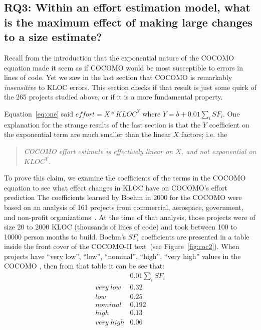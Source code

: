 \documentclass[final,twocolumn]{elsarticle}
\newcommand{\fig}[1]{Figure~\ref{fig:#1}}
\newcommand{\eq}[1]{Equation~\ref{eq:#1}}
\theoremstyle{break}
\begin{document}
\subsection{ RQ3:
  Within an effort estimation model,
  what is the maximum effect of making large changes to a size estimate?}

 Recall from the introduction that the exponential nature of the COCOMO equation
 made it seem as if COCOMO would be most susceptible to errors in lines of code.
 Yet we saw in the last section that COCOMO is remarkably {\em insensitive} to
 KLOC errors.  This section checks if that result is just some quirk of the 265
 projects studied above, or if it is a more fundamental property. 

 \eq{one} said  \mbox{$\mathit{effort} = \mathit{X*KLOC}^Y$}
 where \mbox{$Y={b + 0.01 \sum_i SF_i}$}.
 One explanation for the strange results of the last section is
 that the $Y$ coefficient on the exponential term are much smaller than the
 linear $X$ factors; i.e. the
 \begin{quote}
   {\em COCOMO effort estimate is
     effectively linear on $X$, and not exponential on $\mathit{KLOC^Y}$.}
 \end{quote}
 To prove this claim, we examine the coefficients of the terms in the COCOMO equation to
 see what effect changes in KLOC have on COCOMO's effort prediction
The coefficients learned by Boehm in 2000 for the
COCOMO were based on an analysis of 
161 projects from commercial, aerospace, government, and non-profit organizations~\cite{boehm00b}. At the time of that analysis,
those  projects   were of size 20 to 2000 KLOC (thousands of lines of code) and took between 100 to 10000 person months to build.
Boehm's   $SF_i$ coefficients
are presented in a table inside the front cover of the COCOMO-II text~\cite{boehm00a}(see \fig{coc2}).
When
  projects have ``very low'', ``low'', ``nominal'', ``high'', ``very high'' values in the COCOMO , then from that table it can be see that:
\begin{equation}\label{eq:sf1}
\begin{array}{r|l}
  &0.01 \sum_i  SF_i \\\hline
\mathit{very\; low} & 0.32\\
\mathit{  low} &   0.25\\
\mathit{nominal} &  0.192\\
\mathit{high} &  0.13\\
\mathit{very\; high} &  0.06  
\end{array}
\end{equation}
\end{document}
